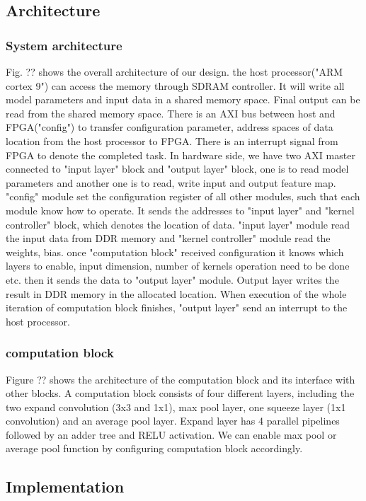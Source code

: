 \documentclass[conference]{IEEEtran}
\begin{document}
\subsection{Architecture}
\subsubsection{System architecture}
Fig. ?? shows the overall architecture of our design. the host processor("ARM cortex 9") can access the memory through SDRAM controller. It will write all model parameters and input data in a shared memory space. Final output can be read from the shared memory space. There is an AXI bus between host and FPGA("config") to transfer configuration parameter, address spaces of data location from the host processor to FPGA. There is an interrupt signal from FPGA to denote the completed task. In hardware side, we have two AXI master connected to "input layer" block and "output layer" block, one is to read model parameters and another one is to read, write input and output feature map. "config" module set the configuration register of all other modules, such that each module know how to operate. It sends the addresses to "input layer" and "kernel controller" block, which denotes the location of data. "input layer" module read the input data from DDR memory and "kernel controller" module read the weights, bias. once "computation block" received configuration it knows which layers to enable, input dimension, number of kernels operation need to be done etc. then it sends the data to "output layer" module. Output layer writes the result in DDR memory in the allocated location. When execution of the whole iteration of computation block finishes, "output layer" send an interrupt to the host processor.


\subsubsection{computation block}
Figure ?? shows the architecture of the computation block and its interface with other blocks. A computation block consists of four different layers, including the two expand convolution (3x3 and 1x1), max pool layer, one squeeze layer (1x1 convolution) and an average pool layer. Expand layer has 4 parallel pipelines followed by an adder tree and RELU activation. We can enable max pool or average pool function by configuring computation block accordingly.


\subsection{Implementation}
\end{document}
